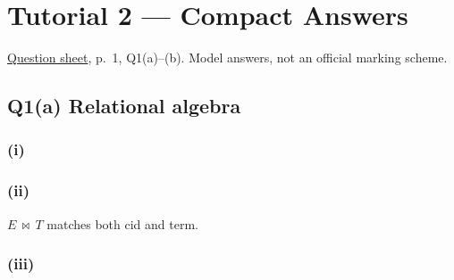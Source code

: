 \clearpage
\section{Tutorial 2 --- Compact Answers}\label{tutorial2_answers}

\href{../../../slides/Tutorial\%202.pdf}{Question sheet}, p.~1, Q1(a)--(b). Model answers, not an official marking scheme.


\subsection{Q1(a) Relational algebra}\label{tutorial2_answers-q1a-relational-algebra}

\subsubsection{(i)}\label{tutorial2_answers-i}


\subsubsection{(ii)}\label{tutorial2_answers-ii}


\(E\,\bowtie \,T\) matches both cid and term.

\subsubsection{(iii)}\label{tutorial2_answers-iii}


